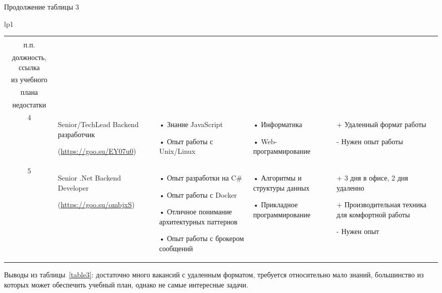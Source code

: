 \documentclass[14pt]{extreport}
\begin{document}
\begin{landscape}
\newpage
Продолжение таблицы 3
\begin{longtable}[H]{lp{1\linewidth}}
\caption{Продолжение таблицы 3}

\centering

\begin{small}


    \begin{tabular}{|c|p{}|p{6cm}|p{5cm}|p{5cm}|}
	\hline 
	\makecell{№ \\ п.п.} &	\makecell{Наименование,\\ должность, ссылка} &	\makecell{Требования} & 	\makecell{Дисциплины \\ из учебного \\плана} &	\makecell{Преимущества и \\недостатки}  \\ 
	\hline 
	4	& Senior/TechLead Backend разработчик
	
(\url{https://goo.su/EY07u0}) &
•	Знание JavaScript

•	Опыт работы с Unix/Linux &
•	Информатика

•	Web-программирование &
+	Удаленный формат работы

-	Нужен опыт работы
\\



	\hline
	5	& Senior .Net Backend Developer
	
(\url{https://goo.su/ombjxS}) &
•	Опыт разработки на C\# 

•	Опыт работы с Docker

•	Отличное понимание архитектурных паттернов 

•	Опыт работы с брокером сообщений &
•	Алгоритмы и структуры данных

•	Прикладное программирование & 
+	3 дня в офисе, 2 дня удаленно
 
+	Производительная техника для комфортной работы

-	Нужен опыт
\\

	\hline 


    \end{tabular}
    \end{small}
\end{longtable}

Выводы из таблицы~\ref{table3}: достаточно много вакансий с удаленным форматом, требуется относительно мало знаний, большинство из которых может обеспечить учебный план, однако не самые интересные задачи. 
\end{landscape}
\end{document}
